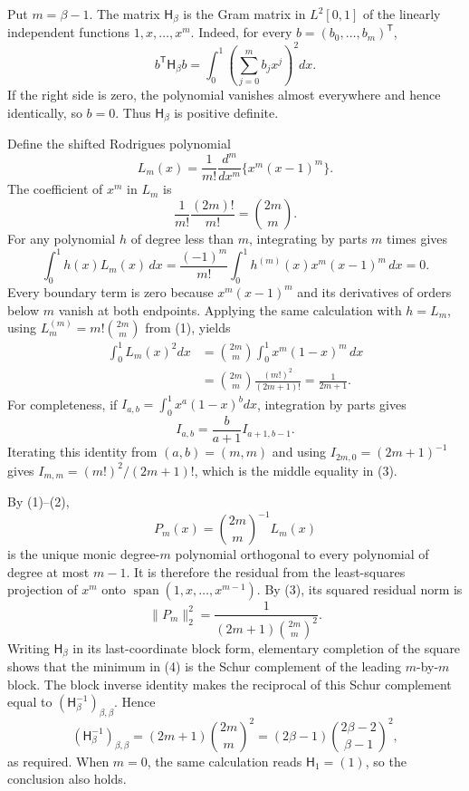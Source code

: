 Put \(m=\beta-1\).  The matrix \(\mathsf H_\beta\) is the Gram matrix in \(L^2[0,1]\) of the linearly independent functions \(1,x,\ldots,x^m\).  Indeed, for every \(b=(b_0,\ldots,b_m)^{\mathsf T}\),
\[
b^{\mathsf T}\mathsf H_\beta b
=\int_0^1\left(\sum_{j=0}^m b_jx^j\right)^2dx.
\]
If the right side is zero, the polynomial vanishes almost everywhere and hence identically, so \(b=0\).  Thus \(\mathsf H_\beta\) is positive definite.

Define the shifted Rodrigues polynomial
\[
L_m(x)=\frac1{m!}\frac{d^m}{dx^m}\{x^m(x-1)^m\}.
\]
The coefficient of \(x^m\) in \(L_m\) is
\[
\frac1{m!}\frac{(2m)!}{m!}=\binom{2m}{m}.
\tag{1}
\]
For any polynomial \(h\) of degree less than \(m\), integrating by parts \(m\) times gives
\[
\int_0^1h(x)L_m(x)\,dx
=\frac{(-1)^m}{m!}\int_0^1h^{(m)}(x)x^m(x-1)^m\,dx=0.
\tag{2}
\]
Every boundary term is zero because \(x^m(x-1)^m\) and its derivatives of orders below \(m\) vanish at both endpoints.  Applying the same calculation with \(h=L_m\), using \(L_m^{(m)}=m!\binom{2m}{m}\) from (1), yields
\[
\begin{aligned}
\int_0^1L_m(x)^2dx
&=\binom{2m}{m}\int_0^1x^m(1-x)^m\,dx\\
&=\binom{2m}{m}\frac{(m!)^2}{(2m+1)!}
=\frac1{2m+1}.
\end{aligned}
\tag{3}
\]
For completeness, if \(I_{a,b}=\int_0^1x^a(1-x)^b dx\), integration by parts gives
\[
I_{a,b}=\frac{b}{a+1}I_{a+1,b-1}.
\]
Iterating this identity from \((a,b)=(m,m)\) and using \(I_{2m,0}=(2m+1)^{-1}\) gives \(I_{m,m}=(m!)^2/(2m+1)!\), which is the middle equality in (3).

By (1)--(2),
\[
P_m(x)=\binom{2m}{m}^{-1}L_m(x)
\]
is the unique monic degree-\(m\) polynomial orthogonal to every polynomial of degree at most \(m-1\).  It is therefore the residual from the least-squares projection of \(x^m\) onto \(\operatorname{span}(1,x,\ldots,x^{m-1})\).  By (3), its squared residual norm is
\[
\|P_m\|_2^2
=\frac1{(2m+1)\binom{2m}{m}^2}.
\tag{4}
\]
Writing \(\mathsf H_\beta\) in its last-coordinate block form, elementary completion of the square shows that the minimum in (4) is the Schur complement of the leading \(m\)-by-\(m\) block.  The block inverse identity makes the reciprocal of this Schur complement equal to \((\mathsf H_\beta^{-1})_{\beta,\beta}\).  Hence
\[
(\mathsf H_\beta^{-1})_{\beta,\beta}
=(2m+1)\binom{2m}{m}^2
=(2\beta-1)\binom{2\beta-2}{\beta-1}^2,
\]
as required.  When \(m=0\), the same calculation reads \(\mathsf H_1=(1)\), so the conclusion also holds.